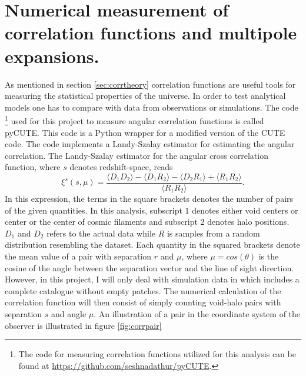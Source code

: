 \section{Numerical measurement of correlation functions and multipole expansions.}\label{sec:numerical_corr}
As mentioned in section \ref{sec:corrtheory} correlation functions are useful
tools for measuring the statistical properties of the universe. In order to test
analytical models one has to compare with data from observations or simulations.
The code \footnote{The code for measuring correlation functions utilized for this analysis can be found at \url{https://github.com/seshnadathur/pyCUTE}.} used for this project to measure angular correlation functions
is called pyCUTE. This code is a Python wrapper for a modified version of the CUTE\cite{alonso2013cute} code. The code implements a Landy-Szalay estimator \cite{Landy} for estimating the angular correlation. The Landy-Szalay estimator
for the angular cross correlation function, where $s$ denotes redshift-space, reads
\begin{equation}
    \xi^s(s,\mu)=\frac{\langle D_1D_2\rangle-\langle D_1R_2\rangle-\langle D_2R_1\rangle+\langle R_1R_2\rangle}{\langle R_1R_2\rangle}.
\end{equation}
In this expression, the terms in the square brackets denotes the number of pairs of the given quantities. In this analysis, subscript $1$ denotes either void centers or center or
the center of cosmic filaments and subscript $2$ denotes halo positions. $D_1$
and $D_2$ refers to the actual data while $R$ is samples from a random
distribution resembling the dataset. Each quantity in the squared brackets
denote the mean value of a pair with separation $r$ and $\mu$, where
$\mu=cos(\theta)$ is the cosine of the angle between the separation vector and
the line of sight direction. However, in this project, I will only deal with simulation data in which includes a complete catalogue without empty patches.
The numerical calculation of the correlation function will then consist of simply counting void-halo pairs with separation $s$ and angle $\mu$.
An illustration of a pair in the coordinate system
of the observer is illustrated in figure \ref{fig:corrpair}
